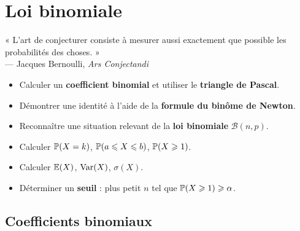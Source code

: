 \chapter{Loi binomiale}

\begin{citationchapitre}
	« L'art de conjecturer consiste à mesurer aussi exactement que possible
	les probabilités des choses. »\\[0.4em]
	— Jacques Bernoulli, \emph{Ars Conjectandi}
\end{citationchapitre}

\begin{objectifs}
	\begin{itemize}[label=\textbullet]
		\item Calculer un \textbf{coefficient binomial} et utiliser le
		\textbf{triangle de Pascal}.
		\item Démontrer une identité à l'aide de la \textbf{formule du binôme
		de Newton}.
		\item Reconnaître une situation relevant de la \textbf{loi
		binomiale} $\mathscr{B}(n,p)$.
		\item Calculer $\mathbb{P}(X=k)$, $\mathbb{P}(a\leqslant X\leqslant b)$,
		$\mathbb{P}(X\geqslant 1)$.
		\item Calculer $\mathbb{E}(X)$, $\mathrm{Var}(X)$, $\sigma(X)$.
		\item Déterminer un \textbf{seuil} : plus petit $n$ tel que
		$\mathbb{P}(X\geqslant 1)\geqslant \alpha$.
	\end{itemize}
\end{objectifs}


\section{Coefficients binomiaux}

